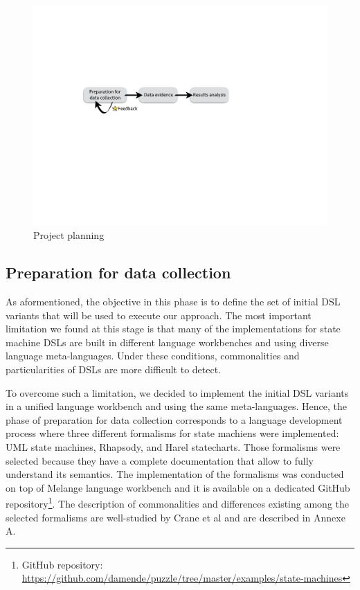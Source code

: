 \begin{figure}[h!]
	\centering
	\includegraphics[width=1\linewidth]{images/planning-casestudy-fig.pdf}
	\caption{Project planning}
	\label{fig:planning}
\end{figure}

\subsection{Preparation for data collection}

As aformentioned, the objective in this phase is to define the set of initial DSL variants that will be used to execute our approach. The most important limitation we found at this stage is that many of the implementations for state machine DSLs are built in different language workbenches and using diverse language meta-languages. Under these conditions, commonalities and particularities of DSLs are more difficult to detect.

To overcome such a limitation, we decided to implement the initial DSL variants in a unified language workbench and using the same meta-languages. Hence, the phase of preparation for data collection corresponds to a language development process where three different formalisms for state machiens were implemented: UML state machines, Rhapsody, and Harel statecharts. Those formalisms were selected because they have a complete documentation that allow to fully understand its semantics. The implementation of the formalisms was conducted on top of Melange \cite{Degueule:2015a} language workbench and it is available on a dedicated GitHub repository\footnote{GitHub repository: \url{https://github.com/damende/puzzle/tree/master/examples/state-machines}}. The description of commonalities and differences existing among the selected formalisms are well-studied by Crane et al and are described in Annexe A.


